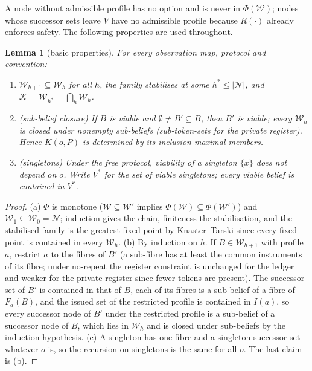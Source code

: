 \documentclass[11pt,a4paper]{article}
\theoremstyle{plain}
\newtheorem{lemma}[theorem]{Lemma}
\theoremstyle{definition}
\theoremstyle{remark}
\newcommand{\calK}{\mathcal{K}}
\newcommand{\calN}{\mathcal{N}}
\newcommand{\calW}{\mathcal{W}}
\newcommand{\Vstar}{V^{\ast}}
\begin{document}
A node without admissible profile has no option and is never in $\Phi(\calW)$; nodes whose successor sets leave $V$ have no admissible profile because $R(\cdot)$ already enforces safety. The following properties are used throughout.

\begin{lemma}[basic properties]\label{lem:basic}
For every observation map, protocol and convention:
\begin{enumerate}[label=(\alph*),leftmargin=2em,itemsep=1pt]
\item $\calW_{h+1}\subseteq\calW_h$ for all $h$, the family stabilises at some $h^{\ast}\le|\calN|$, and $\calK=\calW_{h^{\ast}}=\bigcap_h\calW_h$.
\item (sub-belief closure) If $B$ is viable and $\emptyset\neq B'\subseteq B$, then $B'$ is viable; every $\calW_h$ is closed under nonempty sub-beliefs (sub-token-sets for the private register). Hence $K(o,P)$ is determined by its inclusion-maximal members.
\item (singletons) Under the free protocol, viability of a singleton $\{x\}$ does not depend on $o$. Write $\Vstar$ for the set of viable singletons; every viable belief is contained in $\Vstar$.
\end{enumerate}
\end{lemma}

\begin{proof}
(a) $\Phi$ is monotone ($\calW\subseteq\calW'$ implies $\Phi(\calW)\subseteq\Phi(\calW')$) and $\calW_1\subseteq\calW_0=\calN$; induction gives the chain, finiteness the stabilisation, and the stabilised family is the greatest fixed point by Knaster--Tarski since every fixed point is contained in every $\calW_h$.
(b) By induction on $h$. If $B\in\calW_{h+1}$ with profile $a$, restrict $a$ to the fibres of $B'$ (a sub-fibre has at least the common instruments of its fibre; under no-repeat the register constraint is unchanged for the ledger and weaker for the private register since fewer tokens are present). The successor set of $B'$ is contained in that of $B$, each of its fibres is a sub-belief of a fibre of $F_a(B)$, and the issued set of the restricted profile is contained in $I(a)$, so every successor node of $B'$ under the restricted profile is a sub-belief of a successor node of $B$, which lies in $\calW_h$ and is closed under sub-beliefs by the induction hypothesis.
(c) A singleton has one fibre and a singleton successor set whatever $o$ is, so the recursion on singletons is the same for all $o$. The last claim is (b).
\end{proof}
\end{document}
